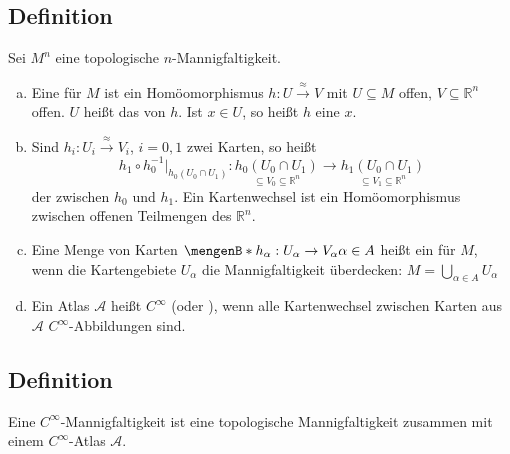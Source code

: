 \subsection[Definition: Karten, Kartenwechsel, Atlanten]{Definition} %
\label{sub:152}
Sei $M^n$ eine topologische $n$-Mannigfaltigkeit. 
\begin{enumerate}[a)]
	\item Eine  für $M$ ist ein Homöomorphismus $h : U \xrightarrow{\approx}V$ mit $U \subseteq M$ offen, $V\subseteq\mathds{R}^n$ offen. $U$ heißt das 
	 von $h$. Ist $x \in U$, so heißt $h$ eine  $x$.
	\item Sind $h_i : U_i \xrightarrow{\approx} V_i$, $i=0,1$ zwei Karten, so heißt 
	\[
		h_1 \circ h_0 ^{-1}\big|_{h_0(U_0 \cap U_1)} : \underset{\subseteq V_0 \subseteq \mathds{R}^n}{h_0(U_0 \cap U_1)} \to \underset{\subseteq V_1 \subseteq 
		\mathds{R}^n}{h_1 (U_0 \cap U_1)}
	\]
	der  zwischen $h_0$ und $h_1$. Ein Kartenwechsel ist ein Homöomorphismus zwischen offenen Teilmengen des $\mathds{R}^n$. 
	\item Eine Menge von Karten $\set[h_\alpha : U_\alpha \to V_\alpha]{\alpha \in A}$ heißt ein  für $M$, wenn die Kartengebiete $U_\alpha$ die 
	Mannigfaltigkeit überdecken:
	\(
		M = \bigcup_{\alpha \in A} U_\alpha
	\)
	\item Ein Atlas $\mathcal{A}$ heißt $C^\infty$ (oder ), wenn alle Kartenwechsel zwischen Karten aus $\mathcal{A}$ 
	$C^\infty$-Abbildun\-gen sind.
\end{enumerate}

\subsection[Definition: Differenzierbare Mannigfaltigkeit]{Definition} %
\label{sub:153}
Eine $C^\infty$-Mannigfaltigkeit ist eine topologische Mannigfaltigkeit zusammen mit einem $C^\infty$-Atlas $\mathcal{A}$.


